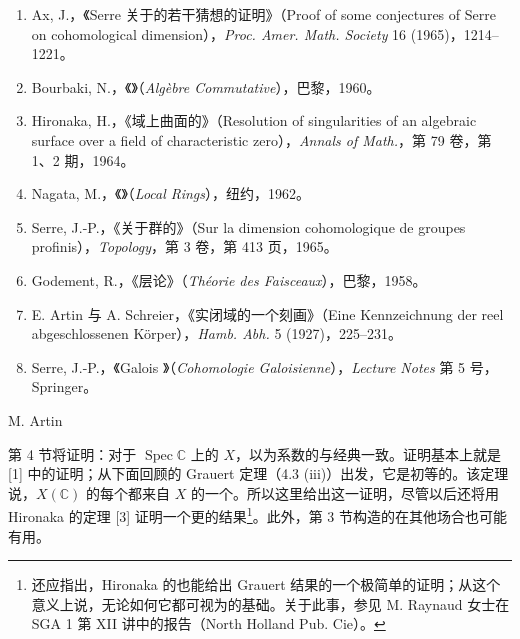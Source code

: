 \begin{enumerate}
\item[{[1]}] Ax, J.，《Serre 关于的若干猜想的证明》（Proof of some conjectures of Serre on cohomological dimension），\textit{Proc. Amer. Math. Society} 16 (1965)，1214--1221。
\item[{[2]}] Bourbaki, N.，《》（\textit{Algèbre Commutative}），巴黎，1960。
\item[{[3]}] Hironaka, H.，《域上曲面的》（Resolution of singularities of an algebraic surface over a field of characteristic zero），\textit{Annals of Math.}，第 79 卷，第 1、2 期，1964。
\item[{[4]}] Nagata, M.，《》（\textit{Local Rings}），纽约，1962。
\item[{[5]}] Serre, J.-P.，《关于群的》（Sur la dimension cohomologique de groupes profinis），\textit{Topology}，第 3 卷，第 413 页，1965。
\item[{[6]}] Godement, R.，《层论》（\textit{Théorie des Faisceaux}），巴黎，1958。
\item[{[7]}] E. Artin 与 A. Schreier，《实闭域的一个刻画》（Eine Kennzeichnung der reel abgeschlossenen Körper），\textit{Hamb. Abh.} 5 (1927)，225--231。
\item[{[8]}] Serre, J.-P.，《Galois 》（\textit{Cohomologie Galoisienne}），\textit{Lecture Notes} 第 5 号，Springer。
\end{enumerate}

\begin{center}M. Artin\end{center}
第 4 节将证明：对于 $\operatorname{Spec}\mathbb C$ 上的 $X$，以为系数的与经典一致。证明基本上就是 [1] 中的证明；从下面回顾的 Grauert 定理（4.3 (iii)）出发，它是初等的。该定理说，$X(\mathbb C)$ 的每个都来自 $X$ 的一个。所以这里给出这一证明，尽管以后还将用 Hironaka 的定理 [3] 证明一个更的结果\footnote{还应指出，Hironaka 的也能给出 Grauert 结果的一个极简单的证明；从这个意义上说，无论如何它都可视为的基础。关于此事，参见 M. Raynaud 女士在 SGA 1 第 XII 讲中的报告（North Holland Pub. Cie）。}。此外，第 3 节构造的在其他场合也可能有用。

